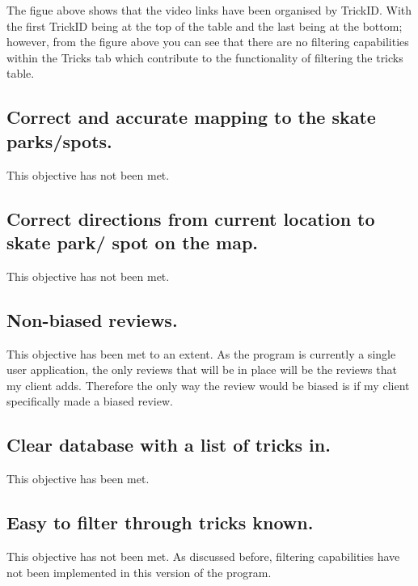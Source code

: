The figue above shows that the video links have been organised by TrickID. With the first TrickID being at the top of the table and the last being at the bottom; however, from the figure above you can see that there are no filtering capabilities within the Tricks tab which contribute to the functionality of filtering the tricks table.




\subsection{Correct and accurate mapping to the skate parks/spots.}

This objective has not been met.



\subsection {Correct directions from current location to skate park/ spot on the map.}

This objective has not been met.



\subsection{Non-biased reviews.}

This objective has been met to an extent. As the program is currently a single user application, the only reviews that will be in place will be the reviews that my client adds. Therefore the only way the review would be biased is if my client specifically made a biased review. 



\subsection{Clear database with a list of tricks in.} %

This objective has been met.


\subsection{ Easy to filter through tricks known.}

This objective has not been met. As discussed before, filtering capabilities have not been implemented in this version of the program.



